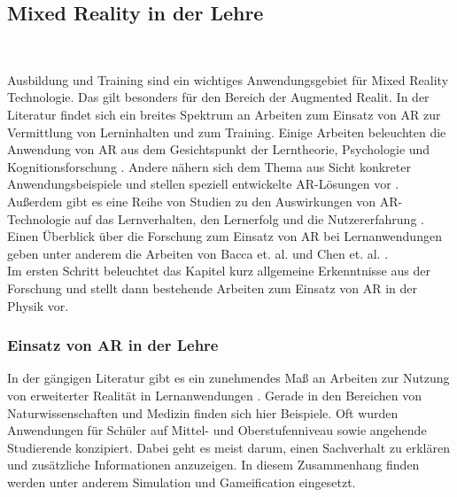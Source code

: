 \subsection{Mixed Reality in der Lehre}
\label{sec-2-2}
\begin{center}
	\\	
\end{center}

Ausbildung und Training sind ein wichtiges Anwendungsgebiet für Mixed Reality Technologie. Das gilt besonders für den Bereich der Augmented Realit. In der Literatur findet sich ein breites Spektrum an Arbeiten zum Einsatz von AR zur Vermittlung von Lerninhalten und zum Training. Einige Arbeiten beleuchten die Anwendung von AR aus dem Gesichtspunkt der Lerntheorie, Psychologie und Kognitionsforschung \cite{Marichal17, Santos14}. Andere nähern sich dem Thema aus Sicht konkreter Anwendungsbeispiele und stellen speziell entwickelte AR-Lösungen vor \cite{Strzys17, Amiraslanov18, Buchau09}. Außerdem gibt es eine Reihe von Studien zu den Auswirkungen von AR-Technologie auf das Lernverhalten, den Lernerfolg und die Nutzererfahrung \cite{Ibanez14, Li11, Jerry10, Akcayir16, Strzys18}. Einen Überblick über die Forschung zum Einsatz von AR bei Lernanwendungen geben unter anderem die Arbeiten von Bacca et. al. und Chen et. al. \cite{Chen2017, Bacca14}.\\

Im ersten Schritt beleuchtet das Kapitel kurz allgemeine Erkenntnisse aus der Forschung und stellt dann bestehende Arbeiten zum Einsatz von AR in der Physik vor.

\subsubsection{Einsatz von AR in der Lehre}
In der gängigen Literatur gibt es ein zunehmendes Maß an Arbeiten zur Nutzung von erweiterter Realität in Lernanwendungen \cite{Bacca14, Ibanez18}. Gerade in den Bereichen von Naturwissenschaften und Medizin finden sich hier Beispiele. Oft wurden Anwendungen für Schüler auf Mittel- und Oberstufenniveau sowie angehende Studierende konzipiert. Dabei geht es meist darum, einen Sachverhalt zu erklären und zusätzliche Informationen anzuzeigen. In diesem Zusammenhang finden werden unter anderem Simulation und Gameification eingesetzt.\\

